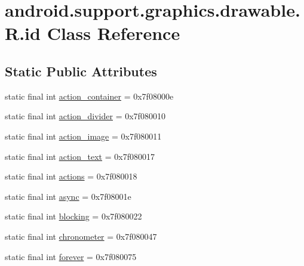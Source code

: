 \hypertarget{classandroid_1_1support_1_1graphics_1_1drawable_1_1_r_1_1id}{}\section{android.\+support.\+graphics.\+drawable.\+R.\+id Class Reference}
\label{classandroid_1_1support_1_1graphics_1_1drawable_1_1_r_1_1id}
\subsection*{Static Public Attributes}
\begin{DoxyCompactItemize}
\item 
static final int \mbox{\hyperlink{classandroid_1_1support_1_1graphics_1_1drawable_1_1_r_1_1id_a30932d97517388e9666277c886f33d52}{action\+\_\+container}} = 0x7f08000e
\item 
static final int \mbox{\hyperlink{classandroid_1_1support_1_1graphics_1_1drawable_1_1_r_1_1id_a9266e81cdb75c20cecd21e7390ea377b}{action\+\_\+divider}} = 0x7f080010
\item 
static final int \mbox{\hyperlink{classandroid_1_1support_1_1graphics_1_1drawable_1_1_r_1_1id_a08713a5c478ae6b3e142e63ef9a8c788}{action\+\_\+image}} = 0x7f080011
\item 
static final int \mbox{\hyperlink{classandroid_1_1support_1_1graphics_1_1drawable_1_1_r_1_1id_a59b447ee33c712fe3be6c44ba8d30add}{action\+\_\+text}} = 0x7f080017
\item 
static final int \mbox{\hyperlink{classandroid_1_1support_1_1graphics_1_1drawable_1_1_r_1_1id_aa0d8db26164bce410f39c9ad39fc25b1}{actions}} = 0x7f080018
\item 
static final int \mbox{\hyperlink{classandroid_1_1support_1_1graphics_1_1drawable_1_1_r_1_1id_a5216cd03a2ef71262b45065d497732ee}{async}} = 0x7f08001e
\item 
static final int \mbox{\hyperlink{classandroid_1_1support_1_1graphics_1_1drawable_1_1_r_1_1id_a660f8c1a84df705acdd2194d63a27dc4}{blocking}} = 0x7f080022
\item 
static final int \mbox{\hyperlink{classandroid_1_1support_1_1graphics_1_1drawable_1_1_r_1_1id_a336ddf79e77d986bd0841b334eed2fad}{chronometer}} = 0x7f080047
\item 
static final int \mbox{\hyperlink{classandroid_1_1support_1_1graphics_1_1drawable_1_1_r_1_1id_a67c3d78718f2d53cffb600a5cbeb4392}{forever}} = 0x7f080075
\item 

\end{DoxyCompactItemize}

